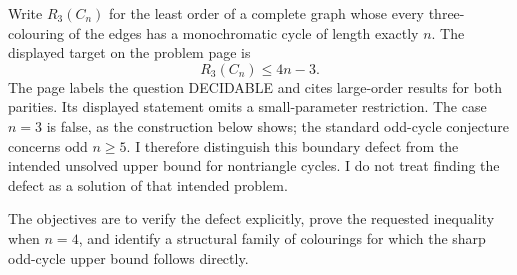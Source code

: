 Write $R_3(C_n)$ for the least order of a complete graph whose every three-colouring of the edges has a monochromatic cycle of length exactly $n$. The displayed target on the problem page is
\[
R_3(C_n)\le4n-3.
\]
The page labels the question DECIDABLE and cites large-order results for both parities. Its displayed statement omits a small-parameter restriction. The case $n=3$ is false, as the construction below shows; the standard odd-cycle conjecture concerns odd $n\ge5$. I therefore distinguish this boundary defect from the intended unsolved upper bound for nontriangle cycles. I do not treat finding the defect as a solution of that intended problem.

The objectives are to verify the defect explicitly, prove the requested inequality when $n=4$, and identify a structural family of colourings for which the sharp odd-cycle upper bound follows directly.
